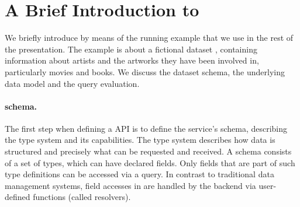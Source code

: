 \section{A Brief Introduction to \gql}\label{sec:bg}


We briefly introduce \gql by means of the running example that we use in
the rest of the presentation.  The example is about a fictional
dataset \goodbois, containing information about artists and the
artworks they have been involved in, particularly movies and books.
We discuss the dataset schema, the underlying data model and the query
evaluation. 




\paragraph{\gql schema.}
The first step when defining a \gql API is to define the service's schema, 
describing the type system and its capabilities.
The type system describes how data is structured and 
precisely what can be requested and received. 
A schema consists of a set of types, which can have declared fields. Only fields that are part of such type definitions can be accessed via a \gql query. In contrast to traditional data management systems, field accesses in \gql are handled by the backend via user-defined functions (called resolvers).


